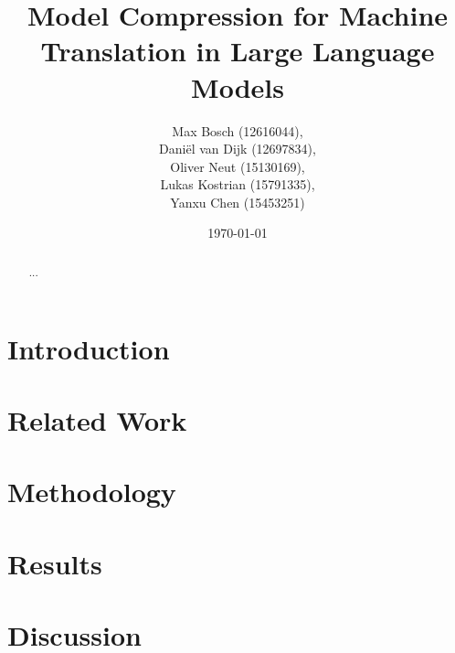 \documentclass[a4paper,11pt]{article}
\title{Model Compression for Machine Translation in Large Language Models}
\author{
    Max Bosch (12616044), \\
    Daniël van Dijk (12697834), \\
    Oliver Neut (15130169), \\
    Lukas Kostrian (15791335), \\
    Yanxu Chen (15453251)
}
\date{\today}
\begin{document}
\maketitle

\begin{abstract}
...
\end{abstract}

\section{Introduction}


\section{Related Work}


\section{Methodology}


\section{Results}


\section{Discussion}


\nocite{*}


\end{document}
